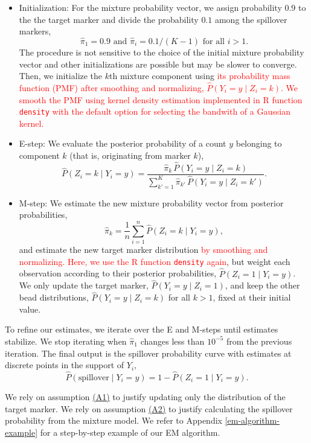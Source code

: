 \documentclass[
]{article}
\begin{document}
\begin{itemize}
\item
  Initialization: For the mixture probability vector, we assign probability \(0.9\) to the the target marker and divide the probability \(0.1\) among the spillover markers,
  \[
  \hat{\pi}_{1} = 0.9 \text{ and } \hat{\pi}_i = 0.1/(K-1) \text{ for all } i > 1.
  \]
  The procedure is not sensitive to the choice of the initial mixture probability vector and other initializations are possible but may be slower to converge. Then, we initialize the \(k\)th mixture component using \textcolor{red}{its probability mass function (PMF) after smoothing and normalizing, $\widehat{P}(Y_i = y \mid Z_i = k)$. We smooth the PMF using kernel density estimation implemented in R function \texttt{density} with the default option for selecting the bandwith of a Gaussian kernel.}
\item
  E-step: We evaluate the posterior probability of a count \(y\) belonging to component \(k\) (that is, originating from marker \(k\)),
  \[
  \widehat{P}\left(Z_i = k \mid Y_i = y \right) = 
  \frac
  { \hat{\pi}_k \, \widehat{P}(Y_i = y \mid Z_i = k) }
  { \sum_{k' = 1}^K \hat{\pi}_{k'} \, \widehat{P}(Y_i = y \mid Z_i = k') }.
  \]
\item
  M-step: We estimate the new mixture probability vector from posterior probabilities,
  \[
  \hat{\pi}_k = 
  \frac{1}{n} \sum_{i = 1}^n \widehat{P}\left(Z_i = k \mid Y_i = y \right),
  \]
  and estimate the new target marker distribution \textcolor{red}{by smoothing and normalizing. Here, we use the R function \texttt{density} again}, but weight each observation according to their posterior probabilities, \(\widehat{P} \left(Z_i = 1 \mid Y_i = y \right)\). We only update the target marker, \(\widehat{P}(Y_i = y \mid Z_i = 1)\), and keep the other bead distributions, \(\widehat{P}(Y_i = y \mid Z_i = k)\) for all \(k > 1\), fixed at their initial value.
\end{itemize}

To refine our estimates, we iterate over the E and M-steps until estimates stabilize. We stop iterating when \(\hat{\pi}_1\) changes less than \(10^{-5}\) from the previous iteration. The final output is the spillover probability curve with estimates at discrete points in the support of \(Y_i\),
\[
\widehat{P}(\text{spillover} \mid Y_i = y) = 1 - \widehat{P}(Z_i = 1 \mid Y_i = y).
\]

We rely on assumption \hyperref[assumption1]{(A1)} to justify updating only the distribution of the target marker. We rely on assumption \hyperref[assumption2]{(A2)} to justify calculating the spillover probability from the mixture model. We refer to Appendix \ref{em-algorithm-example} for a step-by-step example of our EM algorithm.
\end{document}
